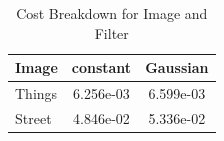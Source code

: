 \documentclass[12pt]{article}
\begin{document}
\begin{table}[h!]
    \centering
    \begin{tabular}{|l|c|c|}
        \hline
        \textbf{Image} & \textbf{constant} & \textbf{Gaussian} \\ \hline
        Things & 6.256e-03 & 6.599e-03 \\ \hline
        Street & 4.846e-02 & 5.336e-02 \\ \hline
    \end{tabular}
    \caption{Cost Breakdown for Image and Filter}
    \label{tab:costs}
\end{table}
\end{document}

